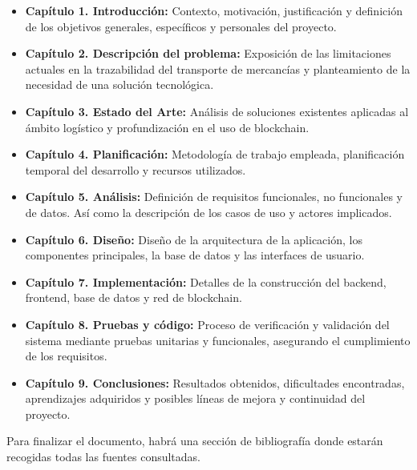 \begin{itemize}
    \item \textbf{Capítulo 1. Introducción:} Contexto, motivación, justificación y definición de los objetivos generales, específicos y personales del proyecto.
    \item \textbf{Capítulo 2. Descripción del problema:} Exposición de las limitaciones actuales en la trazabilidad del transporte de mercancías y planteamiento de la necesidad de una solución tecnológica.
    \item \textbf{Capítulo 3. Estado del Arte:} Análisis de soluciones existentes aplicadas al ámbito logístico y profundización en el uso de blockchain.
    \item \textbf{Capítulo 4. Planificación:} Metodología de trabajo empleada, planificación temporal del desarrollo y recursos utilizados.
    \item \textbf{Capítulo 5. Análisis:} Definición de requisitos funcionales, no funcionales y de datos. Así como la descripción de los casos de uso y actores implicados.
    \item \textbf{Capítulo 6. Diseño:} Diseño de la arquitectura de la aplicación, los componentes principales, la base de datos y las interfaces de usuario.
    \item \textbf{Capítulo 7. Implementación:} Detalles de la construcción del backend, frontend, base de datos y red de blockchain.
    \item \textbf{Capítulo 8. Pruebas y código:} Proceso de verificación y validación del sistema mediante pruebas unitarias y funcionales, asegurando el cumplimiento de los requisitos.
    \item \textbf{Capítulo 9. Conclusiones:} Resultados obtenidos, dificultades encontradas, aprendizajes adquiridos y posibles líneas de mejora y continuidad del proyecto.
\end{itemize}

Para finalizar el documento, habrá una sección de bibliografía donde estarán recogidas todas las fuentes consultadas.
